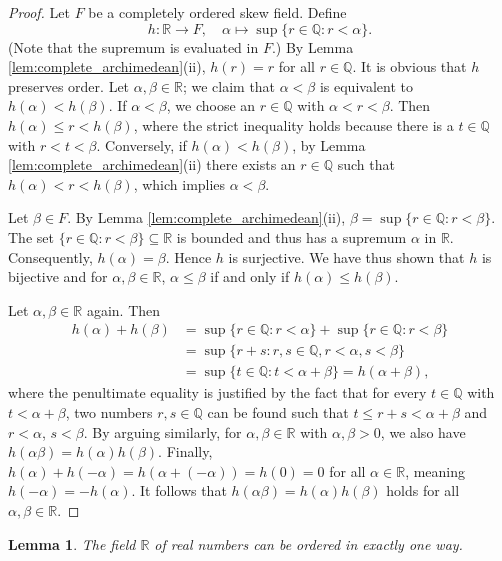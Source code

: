 \documentclass[11pt,a4paper]{article}
\newtheorem{lemma}[theorem]{Lemma}
\begin{document}
\begin{proof}
Let $F$ be a completely ordered skew field. Define
\[ h: \mathbb{R} \to F, \quad \alpha \mapsto \sup \{r \in \mathbb{Q} : r < \alpha\}. \]
(Note that the supremum is evaluated in $F$.) By Lemma \ref{lem:complete_archimedean}(ii), $h(r) = r$ for all $r \in \mathbb{Q}$.
It is obvious that $h$ preserves order. Let $\alpha, \beta \in \mathbb{R}$; we claim that $\alpha < \beta$ is equivalent to $h(\alpha) < h(\beta)$. If $\alpha < \beta$, we choose an $r \in \mathbb{Q}$ with $\alpha < r < \beta$. Then $h(\alpha) \le r < h(\beta)$, where the strict inequality holds because there is a $t \in \mathbb{Q}$ with $r < t < \beta$. Conversely, if $h(\alpha) < h(\beta)$, by Lemma \ref{lem:complete_archimedean}(ii) there exists an $r \in \mathbb{Q}$ such that $h(\alpha) < r < h(\beta)$, which implies $\alpha < \beta$.

Let $\beta \in F$. By Lemma \ref{lem:complete_archimedean}(ii), $\beta = \sup \{r \in \mathbb{Q} : r < \beta\}$. The set $\{r \in \mathbb{Q} : r < \beta\} \subseteq \mathbb{R}$ is bounded and thus has a supremum $\alpha$ in $\mathbb{R}$. Consequently, $h(\alpha) = \beta$. Hence $h$ is surjective. We have thus shown that $h$ is bijective and for $\alpha, \beta \in \mathbb{R}$, $\alpha \le \beta$ if and only if $h(\alpha) \le h(\beta)$.

Let $\alpha, \beta \in \mathbb{R}$ again. Then
\begin{align*}
    h(\alpha) + h(\beta) &= \sup \{r \in \mathbb{Q} : r < \alpha\} + \sup \{r \in \mathbb{Q} : r < \beta\} \\
    &= \sup \{r + s : r, s \in \mathbb{Q}, r < \alpha, s < \beta\} \\
    &= \sup \{t \in \mathbb{Q} : t < \alpha + \beta\} = h(\alpha + \beta),
\end{align*}
where the penultimate equality is justified by the fact that for every $t \in \mathbb{Q}$ with $t < \alpha + \beta$, two numbers $r, s \in \mathbb{Q}$ can be found such that $t \le r + s < \alpha + \beta$ and $r < \alpha$, $s < \beta$.
By arguing similarly, for $\alpha, \beta \in \mathbb{R}$ with $\alpha, \beta > 0$, we also have $h(\alpha\beta) = h(\alpha)h(\beta)$. Finally, $h(\alpha) + h(-\alpha) = h(\alpha + (-\alpha)) = h(0) = 0$ for all $\alpha \in \mathbb{R}$, meaning $h(-\alpha) = -h(\alpha)$. It follows that $h(\alpha\beta) = h(\alpha)h(\beta)$ holds for all $\alpha, \beta \in \mathbb{R}$.
\end{proof}

\begin{lemma} \label{lem:unique_order_R}
The field $\mathbb{R}$ of real numbers can be ordered in exactly one way.
\end{lemma}
\end{document}
